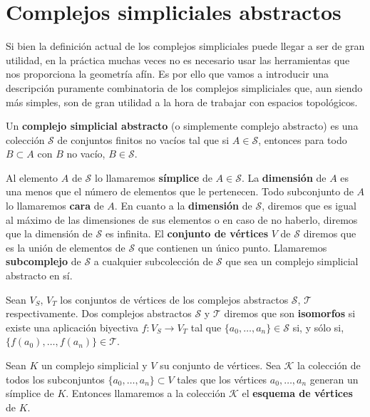 \section{Complejos simpliciales abstractos}

Si bien la definición actual de los complejos simpliciales puede llegar a ser de gran utilidad, en 
la práctica muchas veces no es necesario usar las herramientas que nos proporciona la geometría afín. 
Es por ello que vamos a introducir una descripción puramente combinatoria de los complejos simpliciales 
que, aun siendo más simples, son de gran utilidad a la hora de trabajar con espacios topológicos.

\begin{definicion}
	Un \textbf{complejo simplicial abstracto} (o simplemente complejo abstracto) es una 
	colección $\mathcal{S}$ de conjuntos finitos no vacíos tal que si $A \in \mathcal{S}$, 
	entonces para todo $B \subset A$ con $B$ no vacío, $B \in \mathcal{S}$.
\end{definicion}

Al elemento $A$ de $\mathcal{S}$ lo llamaremos \textbf{símplice} de $A \in \mathcal{S}$. La 
\textbf{dimensión} de $A$ es una menos que el número de elementos que le pertenecen. Todo 
subconjunto de $A$ lo llamaremos \textbf{cara} de $A$. En cuanto a la \textbf{dimensión} de 
$\mathcal{S}$, diremos que es igual al máximo de las dimensiones de sus elementos o en caso de 
no haberlo, diremos que la dimensión de $\mathcal{S}$ es infinita. El \textbf{conjunto de vértices} 
$V$ de $\mathcal{S}$ diremos que es la unión de elementos de $\mathcal{S}$ que contienen un único punto. 
Llamaremos \textbf{subcomplejo} de $\mathcal{S}$ a cualquier subcolección de $\mathcal{S}$ que sea 
un complejo simplicial abstracto en sí.

Sean $V_S$, $V_T$ los conjuntos de vértices de los complejos abstractos $\mathcal{S}$, $\mathcal{T}$  respectivamente. Dos complejos abstractos $\mathcal{S}$ y $\mathcal{T}$ diremos que son 
\textbf{isomorfos} si existe una aplicación biyectiva $f: V_S \rightarrow V_T$ tal que 
$\{a_0, \dots, a_n\} \in \mathcal{S}$ si, y sólo si, $\{f(a_0), \dots, f(a_n)\} \in \mathcal{T}$.

\begin{definicion}
	Sean $K$ un complejo simplicial y $V$ su conjunto de vértices. Sea $\mathcal{K}$ la colección de 
	todos los subconjuntos $\{a_0, \dots, a_n\} \subset V$ tales que los vértices $a_0, \dots, a_n$ 
	generan un símplice de $K$. Entonces llamaremos a la colección $\mathcal{K}$ el 
	\textbf{esquema de vértices} de $K$.
\end{definicion}


